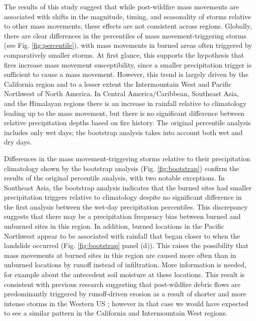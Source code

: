 \documentclass[nhess, manuscript]{copernicus}
\begin{document}
The results of this study suggest that while post-wildfire mass movements are associated with shifts in the magnitude, timing, and seasonality of storms relative to other mass movements, these effects are not consistent across regions.  Globally, there
are clear differences in the percentiles of mass movement-triggering storms
(see Fig. \ref{fig:percentile}), with mass movements in burned areas
often triggered by comparatively smaller storms. At first glance, this supports the hypothesis that fires increase mass movement susceptibility, since a smaller precipitation trigger is sufficient to cause a mass movement. However, this trend is largely driven by the California region and to a lesser extent the Intermountain West and Pacific Northwest of North America. In Central America/Caribbean, Southeast Asia, and the Himalayan regions there is an increase in rainfall relative to climatology leading up to the mass movement, but there is no significant difference between relative precipitation depths based on fire history. 
The original percentile analysis includes only wet days; the bootstrap analysis takes into account both wet and dry days.

Differences in the mass movement-triggering storms relative to their precipitation climatology shown by the bootstrap analysis 
(Fig. \ref{fig:bootstrap}) confirm the results of the original percentile analysis, with two notable exceptions. In Southeast Asia, the bootstrap analysis indicates that the burned sites had smaller precipitation triggers relative to climatology despite no significant difference in the first analysis between the wet-day precipitation percentiles. This discrepancy suggests that there may be a precipitation frequency bias between burned and unburned sites in this region. In addition, burned locations in the Pacific Northwest
appear to be associated with rainfall that began closer to when the
landslide occurred (Fig. \ref{fig:bootstrap} panel (d)). This raises the possibility that mass movements at burned sites in this region are caused more often than in unburned locations by runoff instead of infiltration. More information is needed, for example about the antecedent soil moisture at these locations. This result
is consistent with previous research suggesting that post-wildfire debris
flows are predominantly triggered by runoff-driven erosion as a result
of shorter and more intense storms in the Western US 
\citep[\(76\,\%\)][]{cannonWildfirerelatedDebrisFlow2005}; however in that case we would have expected to see a similar pattern in the California and Intermountain West regions. 
\end{document}
